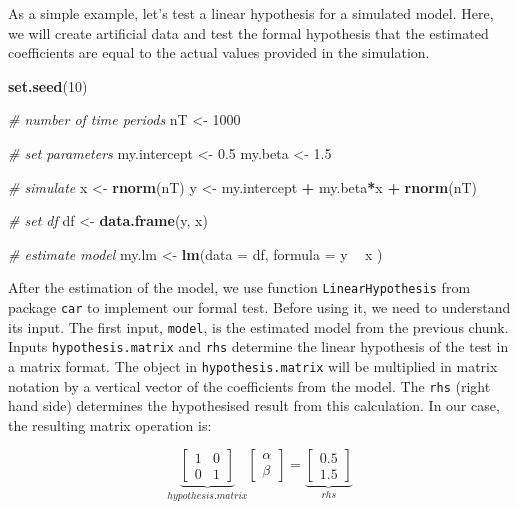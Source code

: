 \documentclass[11pt,]{book}
\newenvironment{Shaded}{\begin{snugshade}}{\end{snugshade}}
\newcommand{\KeywordTok}[1]{\textcolor[rgb]{0.27,0.27,0.27}{\textbf{#1}}}
\newcommand{\DataTypeTok}[1]{\textcolor[rgb]{0.27,0.27,0.27}{#1}}
\newcommand{\DecValTok}[1]{\textcolor[rgb]{0.06,0.06,0.06}{#1}}
\newcommand{\FloatTok}[1]{\textcolor[rgb]{0.06,0.06,0.06}{#1}}
\newcommand{\StringTok}[1]{\textcolor[rgb]{0.5,0.5,0.5}{#1}}
\newcommand{\CommentTok}[1]{\textcolor[rgb]{0.56,0.35,0.01}{\textit{#1}}}
\newcommand{\OperatorTok}[1]{\textcolor[rgb]{0.81,0.36,0.00}{\textbf{#1}}}
\newcommand{\NormalTok}[1]{#1}
\begin{document}
As a simple example, let's test a linear hypothesis for a simulated
model. Here, we will create artificial data and test the formal
hypothesis that the estimated coefficients are equal to the actual
values provided in the simulation.

\begin{Shaded}
\begin{Highlighting}[]
\KeywordTok{set.seed}\NormalTok{(}\DecValTok{10}\NormalTok{)}

\CommentTok{# number of time periods}
\NormalTok{nT <-}\StringTok{ }\DecValTok{1000}

\CommentTok{# set parameters}
\NormalTok{my.intercept <-}\StringTok{ }\FloatTok{0.5}
\NormalTok{my.beta <-}\StringTok{ }\FloatTok{1.5}

\CommentTok{# simulate}
\NormalTok{x <-}\StringTok{ }\KeywordTok{rnorm}\NormalTok{(nT)}
\NormalTok{y <-}\StringTok{ }\NormalTok{my.intercept }\OperatorTok{+}\StringTok{ }\NormalTok{my.beta}\OperatorTok{*}\NormalTok{x }\OperatorTok{+}\StringTok{ }\KeywordTok{rnorm}\NormalTok{(nT)}

\CommentTok{# set df}
\NormalTok{df <-}\StringTok{ }\KeywordTok{data.frame}\NormalTok{(y, x)}

\CommentTok{# estimate model}
\NormalTok{my.lm <-}\StringTok{ }\KeywordTok{lm}\NormalTok{(}\DataTypeTok{data =}\NormalTok{ df, }
            \DataTypeTok{formula =}\NormalTok{ y }\OperatorTok{~}\StringTok{ }\NormalTok{x )}
\end{Highlighting}
\end{Shaded}

After the estimation of the model, we use function
\texttt{LinearHypothesis} from package \texttt{car} \citep{car} to
implement our formal test. Before using it, we need to understand its
input. The first input, \texttt{model}, is the estimated model from the
previous chunk. Inputs \texttt{hypothesis.matrix} and \texttt{rhs}
determine the linear hypothesis of the test in a matrix format. The
object in \texttt{hypothesis.matrix} will be multiplied in matrix
notation by a vertical vector of the coefficients from the model. The
\texttt{rhs} (right hand side) determines the hypothesised result from
this calculation. In our case, the resulting matrix operation is:

\[  \underbrace{\begin{bmatrix}
1 & 0 \\ 
0 & 1
\end{bmatrix}}_{hypothesis.matrix}\begin{bmatrix}
\alpha \\
\beta
\end{bmatrix} = \underbrace{\begin{bmatrix}
0.5 \\ 
1.5  
\end{bmatrix} }_{rhs} \]
\end{document}
